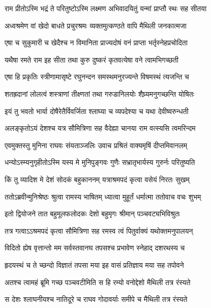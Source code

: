
\twolineshloka
{राम प्रीतोऽस्मि भद्रं ते परितुष्टोऽस्मि लक्ष्मण}
{अभिवादयितुं यन्मां प्राप्तौ स्थः सह सीतया} %

\twolineshloka
{अध्वश्रमेण वां खेदो बाधते प्रचुरश्रमः}
{व्यक्तमुत्कण्ठते वापि मैथिली जनकात्मजा} %

\twolineshloka
{एषा च सुकुमारी च खेदैश्च न विमानिता}
{प्राज्यदोषं वनं प्राप्ता भर्तृस्नेहप्रचोदिता} %

\twolineshloka
{यथैषा रमते राम इह सीता तथा कुरु}
{दुष्करं कृतवत्येषा वने त्वामभिगच्छती} %

\twolineshloka
{एषा हि प्रकृतिः स्त्रीणामासृष्टे रघुनन्दन}
{समस्थमनुरज्यन्ते विषमस्थं त्यजन्ति च} %

\twolineshloka
{शतह्रदानां लोलत्वं शस्त्राणां तीक्ष्णतां तथा}
{गरुडानिलयोः शैघ्र्यमनुगच्छन्ति योषितः} %

\twolineshloka
{इयं तु भवतो भार्या दोषैरेतैर्विवर्जिता}
{श्लाघ्या च व्यपदेश्या च यथा देवीष्वरुन्धती} %

\twolineshloka
{अलङ्कृतोऽयं देशश्च यत्र सौमित्रिणा सह}
{वैदेह्या चानया राम वत्स्यसि त्वमरिन्दम} %

\twolineshloka
{एवमुक्तस्तु मुनिना राघवः संयताञ्जलिः}
{उवाच प्रश्रितं वाक्यमृषिं दीप्तमिवानलम्} %

\twolineshloka
{धन्योऽस्म्यनुगृहीतोऽस्मि यस्य मे मुनिपुङ्गवः}
{गुणैः सभ्रातृभार्यस्य गुरुर्नः परितुष्यति} %

\twolineshloka
{किं तु व्यादिश मे देशं सोदकं बहुकाननम्}
{यत्राश्रमपदं कृत्वा वसेयं निरतः सुखम्} %

\twolineshloka
{ततोऽब्रवीन्मुनिश्रेष्ठः श्रुत्वा रामस्य भाषितम्}
{ध्यात्वा मुहूर्तं धर्मात्मा ततोवाच वचः शुभम्} %

\twolineshloka
{इतो द्वियोजने तात बहुमूलफलोदकः}
{देशो बहुमृगः श्रीमान् पञ्चवट्यभिविश्रुतः} %

\twolineshloka
{तत्र गत्वाऽऽश्रमपदं कृत्वा सौमित्रिणा सह}
{रमस्व त्वं पितुर्वाक्यं यथोक्तमनुपालयन्} %

\twolineshloka
{विदितो ह्येष वृत्तान्तो मम सर्वस्तवानघ}
{तपसश्च प्रभावेण स्नेहाद् दशरथस्य च} %

\twolineshloka
{हृदयस्थं च ते च्छन्दो विज्ञातं तपसा मया}
{इह वासं प्रतिज्ञाय मया सह तपोवने} %

\twolineshloka
{अतश्च त्वामहं ब्रूमि गच्छ पञ्चवटीमिति}
{स हि रम्यो वनोद्देशो मैथिली तत्र रंस्यते} %

\twolineshloka
{स देशः श्लाघनीयश्च नातिदूरे च राघव}
{गोदावर्याः समीपे च मैथिली तत्र रंस्यते} %

